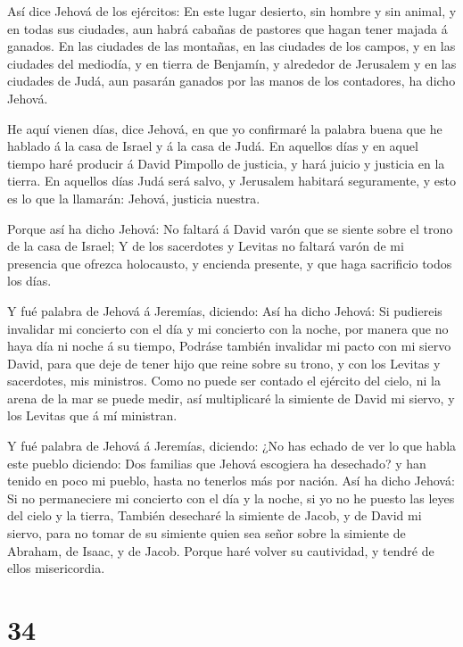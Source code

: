  Así dice Jehová de los ejércitos: En este lugar desierto,
sin hombre y sin animal, y en todas sus ciudades, aun habrá cabañas de
pastores que hagan tener majada á ganados.  En las ciudades
de las montañas, en las ciudades de los campos, y en las ciudades del
mediodía, y en tierra de Benjamín, y alrededor de Jerusalem y en las
ciudades de Judá, aun pasarán ganados por las manos de los contadores,
ha dicho Jehová.

 He aquí vienen días, dice Jehová, en que yo confirmaré la
palabra buena que he hablado á la casa de Israel y á la casa de Judá.
 En aquellos días y en aquel tiempo haré producir á David
Pimpollo de justicia, y hará juicio y justicia en la tierra.
 En aquellos días Judá será salvo, y Jerusalem habitará
seguramente, y esto es lo que la llamarán: Jehová, justicia nuestra.

 Porque así ha dicho Jehová: No faltará á David varón que
se siente sobre el trono de la casa de Israel;  Y de los
sacerdotes y Levitas no faltará varón de mi presencia que ofrezca
holocausto, y encienda presente, y que haga sacrificio todos los días.

 Y fué palabra de Jehová á Jeremías, diciendo:
 Así ha dicho Jehová: Si pudiereis invalidar mi concierto
con el día y mi concierto con la noche, por manera que no haya día ni
noche á su tiempo,  Podráse también invalidar mi pacto con
mi siervo David, para que deje de tener hijo que reine sobre su trono, y
con los Levitas y sacerdotes, mis ministros.  Como no puede
ser contado el ejército del cielo, ni la arena de la mar se puede medir,
así multiplicaré la simiente de David mi siervo, y los Levitas que á mí
ministran.

 Y fué palabra de Jehová á Jeremías, diciendo:
 ¿No has echado de ver lo que habla este pueblo diciendo:
Dos familias que Jehová escogiera ha desechado? y han tenido en poco mi
pueblo, hasta no tenerlos más por nación.  Así ha dicho
Jehová: Si no permaneciere mi concierto con el día y la noche, si yo no
he puesto las leyes del cielo y la tierra,  También
desecharé la simiente de Jacob, y de David mi siervo, para no tomar de
su simiente quien sea señor sobre la simiente de Abraham, de Isaac, y de
Jacob. Porque haré volver su cautividad, y tendré de ellos misericordia.

\hypertarget{section-33}{%
\section{34}\label{section-33}}

